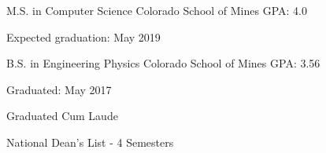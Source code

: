 \begin{cventries}
  \cventry
    {M.S. in Computer Science}
    {Colorado School of Mines}
    {}
    {GPA: 4.0}
    {
      \begin{cvitems}
         \item {Expected graduation: May 2019}
      \end{cvitems}
    }
  \cventry
    {B.S. in Engineering Physics}
    {Colorado School of Mines}
    {}
    {GPA: 3.56}
    {
      \begin{cvitems}
        \item {Graduated: May 2017}
        \item {Graduated Cum Laude}
        \item {National Dean’s List - 4 Semesters}
      \end{cvitems}
    }
\end{cventries}

